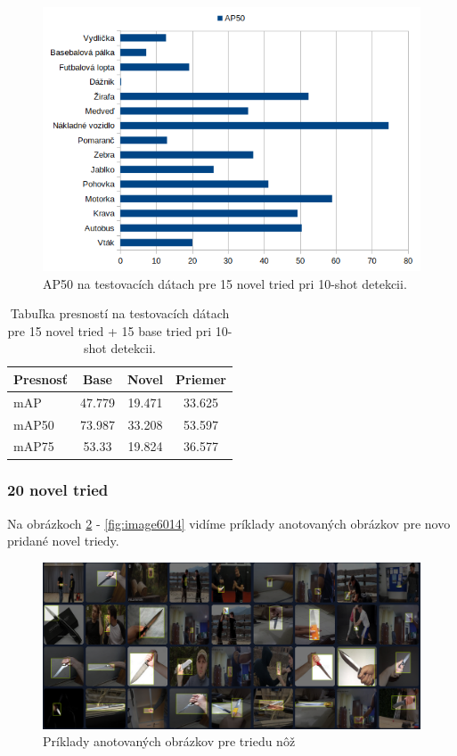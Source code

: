 \begin{figure}[H]
\centering
\includegraphics[width=\textwidth]{images/15novel_classes_chart.png}
\caption{AP50 na testovacích dátach pre 15 novel tried pri 10-shot detekcii.}
\label{fig:image612}
\end{figure}

\begin{table}[H]
\begin{tabular}{|l|c|c|c|}
\hline
\textbf{Presnosť} & \textbf{Base} & \textbf{Novel} & \textbf{Priemer} \\
\hline
mAP & 47.779 & 19.471 & 33.625 \\
mAP50 & 73.987 & 33.208 & 53.597 \\
mAP75 & 53.33 & 19.824 & 36.577 \\
\hline
\end{tabular}
\centering
\caption{Tabuľka presností na testovacích dátach pre 15 novel tried + 15 base tried pri 10-shot detekcii.}
\label{tab:table61}
\end{table}

\subsubsection{20 novel tried}

Na obrázkoch \ref{fig:image6010} - \ref{fig:image6014} vidíme príklady anotovaných obrázkov pre novo pridané novel triedy.

\begin{figure}[H]
\centering
\includegraphics[width=\textwidth]{images/knife_example_annotations.png}
\caption{Príklady anotovaných obrázkov pre triedu nôž}
\label{fig:image6010}
\end{figure}

